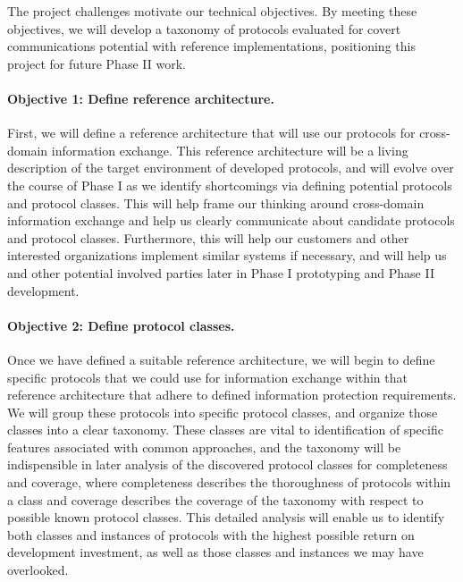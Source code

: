\documentclass{sbir}
\begin{document}
{The project challenges motivate our technical objectives. By meeting these objectives, we will develop a taxonomy of protocols evaluated for covert communications potential with reference implementations, positioning this project for future Phase II work.}

\paragraph{Objective 1: Define reference architecture.} First, we will define a reference architecture that will use our protocols for cross-domain information exchange. This reference architecture will be a living description of the target environment of developed protocols, and will evolve over the course of Phase I as we identify shortcomings via defining potential protocols and protocol classes. This will help frame our thinking around cross-domain information exchange and help us clearly communicate about candidate protocols and protocol classes. Furthermore, this will help our customers and other interested organizations implement similar systems if necessary, and will help us and other potential involved parties later in Phase I prototyping and Phase II development.

\paragraph{Objective 2: Define protocol classes.} Once we have defined a suitable reference architecture, we will begin to define specific protocols that we could use for information exchange within that reference architecture that adhere to defined information protection requirements. We will group these protocols into specific protocol classes, and organize those classes into a clear taxonomy. These classes are vital to identification of specific features associated with common approaches, and the taxonomy will be indispensible in later analysis of the discovered protocol classes for completeness and coverage, where completeness describes the thoroughness of protocols within a class and coverage describes the coverage of the taxonomy with respect to possible known protocol classes. This detailed analysis will enable us to identify both classes and instances of protocols with the highest possible return on development investment, as well as those classes and instances we may have overlooked.
\end{document}
